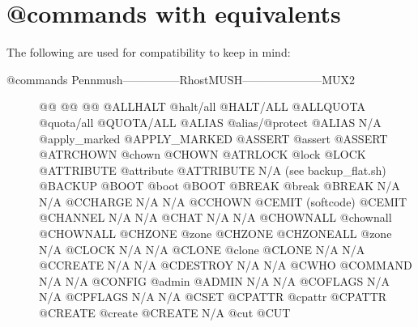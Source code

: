 \documentclass[letterpaper,10pt,english]{sphinxmanual}
\begin{document}
\section{@commands with equivalents}
\label{\detokenize{differences:commands-with-equivalents}}
\sphinxAtStartPar
The following are used for compatibility to keep in mind:
\begin{description}
\item[{@commands Pennmush—————\sphinxhyphen{}RhostMUSH———————\sphinxhyphen{}MUX2}] \leavevmode
\sphinxAtStartPar
@@                      @@                             @@
@ALLHALT                @halt/all                      @HALT/ALL
@ALLQUOTA               @quota/all                     @QUOTA/ALL
@ALIAS                  @alias/@protect                @ALIAS
N/A                     @apply\_marked                  @APPLY\_MARKED
@ASSERT                 @assert                        @ASSERT
@ATRCHOWN               @chown                         @CHOWN
@ATRLOCK                @lock                          @LOCK
@ATTRIBUTE              @attribute                     @ATTRIBUTE
N/A                     (see backup\_flat.sh)           @BACKUP
@BOOT                   @boot                          @BOOT
@BREAK                  @break                         @BREAK
N/A                     N/A                            @CCHARGE
N/A                     N/A                            @CCHOWN
@CEMIT                  (softcode)                     @CEMIT
@CHANNEL                N/A                            N/A
@CHAT                   N/A                            N/A
@CHOWNALL               @chownall                      @CHOWNALL
@CHZONE                 @zone                          @CHZONE
@CHZONEALL              @zone                          N/A
@CLOCK                  N/A                            N/A
@CLONE                  @clone                         @CLONE
N/A                     N/A                            @CCREATE
N/A                     N/A                            @CDESTROY
N/A                     N/A                            @CWHO
@COMMAND                N/A                            N/A
@CONFIG                 @admin                         @ADMIN
N/A                     N/A                            @COFLAGS
N/A                     N/A                            @CPFLAGS
N/A                     N/A                            @CSET
@CPATTR                 @cpattr                        @CPATTR
@CREATE                 @create                        @CREATE
N/A                     @cut                           @CUT

\end{description}
\end{document}
